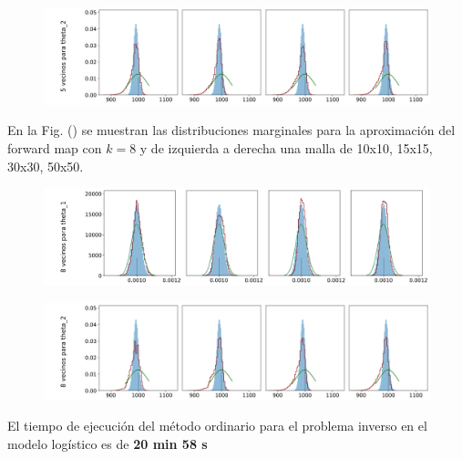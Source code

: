 \begin{figure}[H] 
    \centering 
    \includegraphics[width = 16 cm ]{img/Exp_Central_logistico_Sigma/Figuras/Generales/Convergencia_theta2_2_logistico_sigma.png} 
\end{figure} 

En la Fig. () se muestran las distribuciones marginales para la aproximación del forward map con $k = 8$ y de izquierda a derecha una malla de 10x10, 15x15, 30x30, 50x50.

\begin{figure}[H] 
    \centering 
    \includegraphics[width = 16 cm ]{img/Exp_Central_logistico_Sigma/Figuras/Generales/Convergencia_theta1_3_logistico_sigma.png} 
\end{figure} 

\begin{figure}[H] 
    \centering 
    \includegraphics[width = 16 cm ]{img/Exp_Central_logistico_Sigma/Figuras/Generales/Convergencia_theta2_3_logistico_sigma.png} 
\end{figure} 



El tiempo de ejecución del método ordinario para el problema inverso en el modelo logístico es de \textbf{20 min 58 s}


